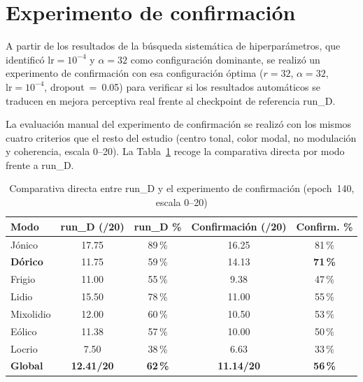 \documentclass[%
    school=etsisi,%
    type=pfg,%
    degree=61CD,%
]{upm-report}
\begin{document}
\section{Experimento de confirmaci\'on}
\label{s:experimento-confirmacion}
\label{s:confirm-exp}

A partir de los resultados de la b\'usqueda sistem\'atica de hiperpar\'ametros, que identific\'o $\text{lr} = 10^{-4}$ y $\alpha = 32$ como configuraci\'on dominante, se realiz\'o un experimento de confirmaci\'on con esa configuraci\'on \'optima ($r=32$, $\alpha=32$, $\text{lr}=10^{-4}$, dropout~=~0.05) para verificar si los resultados autom\'aticos se traducen en mejora perceptiva real frente al checkpoint de referencia run\_D.

La evaluaci\'on manual del experimento de confirmaci\'on se realiz\'o con los mismos cuatro criterios que el resto del estudio (centro tonal, color modal, no modulaci\'on y coherencia, escala 0--20). La Tabla~\ref{tab:confirm-comparativa} recoge la comparativa directa por modo frente a run\_D.

\begin{table}[htbp]
    \centering
    \caption{Comparativa directa entre run\_D y el experimento de confirmaci\'on (epoch~140, escala 0--20)}
    \label{tab:confirm-comparativa}
    \begin{tabular}{lcccc}
        \toprule
        \textbf{Modo} & \textbf{run\_D (/20)} & \textbf{run\_D \%} & \textbf{Confirmaci\'on (/20)} & \textbf{Confirm. \%} \\
        \midrule
        J\'onico              & 17.75 & 89\,\% & 16.25 & 81\,\% \\
        \textbf{D\'orico}     & 11.75 & 59\,\% & 14.13 & \textbf{71\,\%} \\
        Frigio                & 11.00 & 55\,\% &  9.38 & 47\,\% \\
        Lidio                 & 15.50 & 78\,\% & 11.00 & 55\,\% \\
        Mixolidio             & 12.00 & 60\,\% & 10.50 & 53\,\% \\
        E\'olico              & 11.38 & 57\,\% & 10.00 & 50\,\% \\
        Locrio                &  7.50 & 38\,\% &  6.63 & 33\,\% \\
        \midrule
        \textbf{Global} & \textbf{12.41/20} & \textbf{62\,\%} & \textbf{11.14/20} & \textbf{56\,\%} \\
        \bottomrule
    \end{tabular}
\end{table}
\end{document}
